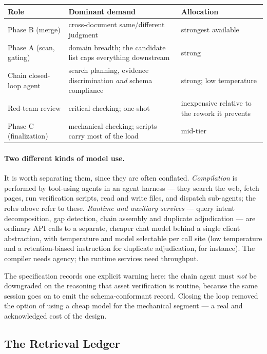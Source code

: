 \documentclass[10pt,a4paper]{article}
\begin{document}
\begin{center}\small
\begin{tabular}{@{}p{40mm}p{56mm}p{40mm}@{}}
\toprule
Role & Dominant demand & Allocation \\
\midrule
Phase B (merge) & cross-document same/different judgment & strongest available \\
Phase A (scan, gating) & domain breadth; the candidate list caps everything downstream & strong \\
Chain closed-loop agent & search planning, evidence discrimination \emph{and} schema compliance & strong; low temperature \\
Red-team review & critical checking; one-shot & inexpensive relative to the rework it prevents \\
Phase C (finalization) & mechanical checking; scripts carry most of the load & mid-tier \\
\bottomrule
\end{tabular}
\end{center}

\paragraph{Two different kinds of model use.} It is worth separating them, since
they are often conflated. \emph{Compilation} is performed by tool-using agents in
an agent harness --- they search the web, fetch pages, run verification scripts,
read and write files, and dispatch sub-agents; the roles above refer to these.
\emph{Runtime and auxiliary services} --- query intent decomposition, gap
detection, chain assembly and duplicate adjudication --- are ordinary API calls to
a separate, cheaper chat model behind a single client abstraction, with
temperature and model selectable per call site (low temperature and a
retention-biased instruction for duplicate adjudication, for instance). The
compiler needs agency; the runtime services need throughput.

\noindent The specification records one explicit warning here: the chain agent
must \emph{not} be downgraded on the reasoning that asset verification is
routine, because the same session goes on to emit the schema-conformant record.
Closing the loop removed the option of using a cheap model for the mechanical
segment --- a real and acknowledged cost of the design.


\subsection{The Retrieval Ledger}
\label{sec:evidence}
\end{document}
